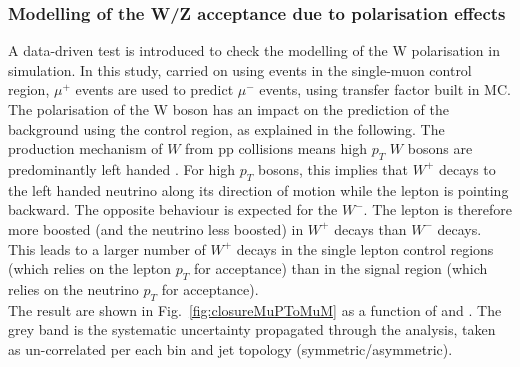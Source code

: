 \subsubsection*{Modelling of the W/Z acceptance due to polarisation effects}
\label{sec:tfSyst_Wpol}
A data-driven test is introduced to check the modelling of the W polarisation in simulation. 
In this study, carried on using events in the single-muon control region, $\mu^{+}$ events 
are used to predict $\mu^{-}$ events, using transfer factor built in MC. 
The polarisation of the W boson has an impact on the prediction 
of the \znunu background using the \mj control region, as explained in the following. 
The production mechanism of $W$ from pp
collisions means high $p_T$ $W$ bosons are predominantly left handed
\cite{WPol}.  For high $p_T$ bosons, this implies that $W^+$ decays to
the left handed neutrino along its direction of motion while the
lepton is pointing backward. The opposite behaviour is expected for
the $W^-$. The lepton is therefore more boosted (and the neutrino less
boosted) in $W^+$ decays than $W^-$ decays.  This leads to a larger
number of $W^+$ decays in the single lepton control regions (which
relies on the lepton $p_T$ for acceptance) than in the signal region
(which relies on the neutrino $p_T$ for acceptance). \\
The result are shown in Fig.~\ref{fig:closureMuPToMuM} as a function of \scalht and \njet. 
The grey band is the systematic uncertainty propagated through the analysis, 
taken as un-correlated per each \scalht bin and jet topology (symmetric/asymmetric).


